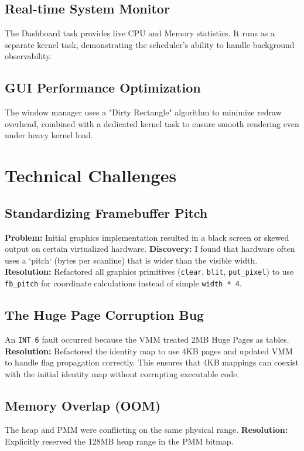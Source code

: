 \documentclass[12pt,a4paper]{report}
\begin{document}
\section{Real-time System Monitor}
The Dashboard task provides live CPU and Memory statistics. It runs as a separate kernel task, demonstrating the scheduler's ability to handle background observability.

\section{GUI Performance Optimization}
The window manager uses a "Dirty Rectangle" algorithm to minimize redraw overhead, combined with a dedicated kernel task to ensure smooth rendering even under heavy kernel load.

\newpage

\chapter{Technical Challenges}

\section{Standardizing Framebuffer Pitch}
\textbf{Problem:} Initial graphics implementation resulted in a black screen or skewed output on certain virtualized hardware.
\textbf{Discovery:} I found that hardware often uses a `pitch` (bytes per scanline) that is wider than the visible width.
\textbf{Resolution:} Refactored all graphics primitives (\texttt{clear}, \texttt{blit}, \texttt{put\_pixel}) to use \texttt{fb\_pitch} for coordinate calculations instead of simple \texttt{width * 4}.

\section{The Huge Page Corruption Bug}
An \texttt{INT 6} fault occurred because the VMM treated 2MB Huge Pages as tables. 
\textbf{Resolution:} Refactored the identity map to use 4KB pages and updated VMM to handle flag propagation correctly. This ensures that 4KB mappings can coexist with the initial identity map without corrupting executable code.

\section{Memory Overlap (OOM)}
The heap and PMM were conflicting on the same physical range.
\textbf{Resolution:} Explicitly reserved the 128MB heap range in the PMM bitmap.
\end{document}
